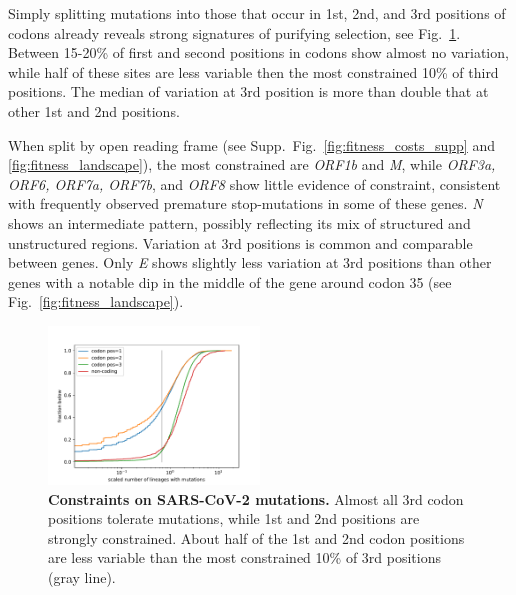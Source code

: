 \documentclass[aps,rmp, twocolumn]{revtex4}
\begin{document}
Simply splitting mutations into those that occur in 1st, 2nd, and 3rd positions of codons already reveals strong signatures of purifying selection, see Fig.~\ref{fig:fitness_costs}.
Between 15-20\% of first and second positions in codons show almost no variation, while half of these sites are less variable then the most constrained 10\% of third positions.
The median of variation at 3rd position is more than double that at other 1st and 2nd positions.

When split by open reading frame (see Supp.~Fig.~\ref{fig:fitness_costs_supp} and \ref{fig:fitness_landscape}), the most constrained are \emph{ORF1b} and \emph{M}, while \emph{ORF3a, ORF6, ORF7a, ORF7b}, and \emph{ORF8} show little evidence of constraint, consistent with frequently observed premature stop-mutations in some of these genes.
\emph{N} shows an intermediate pattern, possibly reflecting its mix of structured and unstructured regions.
Variation at 3rd positions is common and comparable between genes.
Only \emph{E} shows slightly less variation at 3rd positions than other genes with a notable dip in the middle of the gene around codon 35 (see Fig.~\ref{fig:fitness_landscape}).



\begin{figure}
    \includegraphics[width=0.5\textwidth]{figures/fitness_cost.pdf}
    \caption{{\bf Constraints on SARS-CoV-2 mutations.}
    Almost all 3rd codon positions tolerate mutations, while 1st and 2nd positions are strongly constrained.
    About half of the 1st and 2nd codon positions are less variable than the most constrained 10\% of 3rd positions (gray line).
    \label{fig:fitness_costs}}
 \end{figure}
\end{document}
